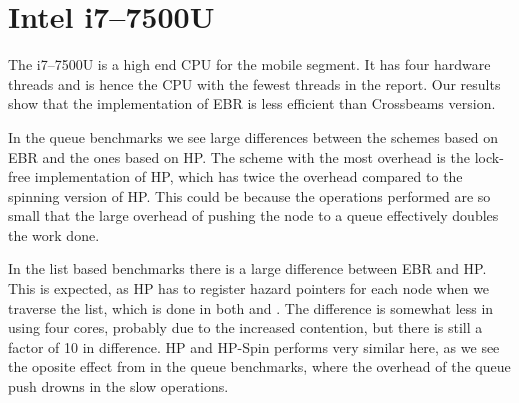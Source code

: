 \documentclass[b5paper]{report}
\begin{document}
\newcommand{\benches}[2]{
  \begin{figure}[ht]
    \centering
    \begin{subfigure}{0.49\textwidth}
      \centering \footnotesize\code{Queue::Pop}
      \texttt{[image: plots/\#1-b:queue\_pop.pdf]}
    \end{subfigure}
    \begin{subfigure}{0.49\textwidth}
      \centering \footnotesize\code{Queue::Transfer}
      \texttt{[image: plots/\#1-b:queue\_transfer.pdf]}
    \end{subfigure}
    \\\vspace{0.25cm}
    \begin{subfigure}{0.49\textwidth}
      \centering \footnotesize\code{List::Remove}
      \texttt{[image: plots/\#1-b:list\_remove.pdf]}
    \end{subfigure}
    \begin{subfigure}{0.49\textwidth}
      \centering \footnotesize\code{List::Real}
      \texttt{[image: plots/\#1-b:list\_real.pdf]}
    \end{subfigure}
    \caption{Benchmarks relative to no memory reclamation for the #2}
  \end{figure}
}

\clearpage
\section{Intel\textregistered{} i7--7500U}

The i7--7500U is a high end CPU for the mobile segment. It has four hardware
threads and is hence the CPU with the fewest threads in the report. Our results
show that the implementation of EBR is less efficient than Crossbeams version.

In the queue benchmarks we see large differences between the schemes based on
EBR and the ones based on HP\@. The scheme with the most overhead is the
lock-free implementation of HP, which has twice the overhead compared to the
spinning version of HP\@. This could be because the operations performed are so
small that the large overhead of pushing the node to a queue effectively doubles
the work done.

In the list based benchmarks there is a large difference between EBR and HP\@.
This is expected, as HP has to register hazard pointers for each node when we
traverse the list, which is done in both  and . The
difference is somewhat less in  using four cores, probably due to the
increased contention, but there is still a factor of 10 in difference. HP and
HP-Spin performs very similar here, as we see the oposite effect from in the
queue benchmarks, where the overhead of the queue push drowns in the slow
operations.
\end{document}
